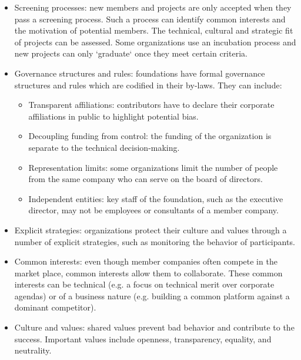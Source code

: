 \begin{itemize}

\item Screening processes: new members and projects are only accepted when they pass a screening process.  Such a process can identify common interests and the motivation of potential members.  The technical, cultural and strategic fit of projects can be assessed.  Some organizations use an incubation process and new projects can only `graduate` once they meet certain criteria.

\item Governance structures and rules: foundations have formal governance structures and rules which are codified in their by-laws.  They can include:

\begin{itemize}

\item Transparent affiliations: contributors have to declare their corporate affiliations in public to highlight potential bias.

\item Decoupling funding from control: the funding of the organization is separate to the technical decision-making.

\item Representation limits: some organizations limit the number of people from the same company who can serve on the board of directors.

\item Independent entities: key staff of the foundation, such as the executive director, may not be employees or consultants of a member company.

\end{itemize}

\item Explicit strategies: organizations protect their culture and values through a number of explicit strategies, such as monitoring the behavior of participants.

\item Common interests: even though member companies often compete in the market place, common interests allow them to collaborate.  These common interests can be technical (e.g. a focus on technical merit over corporate agendas) or of a business nature (e.g. building a common platform against a dominant competitor).

\item Culture and values: shared values prevent bad behavior and contribute to the success.  Important values include openness, transparency, equality, and neutrality.

\end{itemize}

